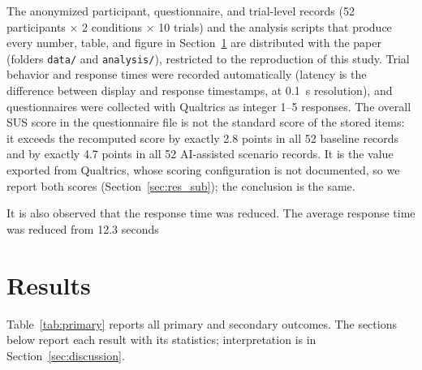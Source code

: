 \documentclass[journal]{IEEEtran}
\theoremstyle{plain}
\theoremstyle{definition}
\providecommand{\DIFaddtex}[1]{{\protect\color{blue} \sf #1}} %
\providecommand{\DIFdeltex}[1]{{\protect\color{red} \scriptsize #1}} %
\providecommand{\DIFaddbegin}{} %
\providecommand{\DIFaddend}{} %
\providecommand{\DIFdelbegin}{} %
\providecommand{\DIFdelend}{} %
\providecommand{\DIFadd}[1]{\texorpdfstring{\DIFaddtex{#1}}{#1}} %
\providecommand{\DIFdel}[1]{\texorpdfstring{\DIFdeltex{#1}}{}} %
\newcommand{\DIFscaledelfig}{0.5}
\newlength{\DIFdelgraphicswidth} %
\newlength{\DIFdelgraphicsheight} %
\newcommand{\DIFaddincludegraphics}[2][]{{\color{blue}\fbox{\DIFOincludegraphics[#1]{#2}}}} %
\newcommand{\DIFdelincludegraphics}[2][]{%
\sbox{\DIFdelgraphicsbox}{\DIFOincludegraphics[#1]{#2}}%
\settoboxwidth{\DIFdelgraphicswidth}{\DIFdelgraphicsbox} %
\settoboxtotalheight{\DIFdelgraphicsheight}{\DIFdelgraphicsbox} %
\scalebox{\DIFscaledelfig}{%
\parbox[b]{\DIFdelgraphicswidth}{\usebox{\DIFdelgraphicsbox}\\[-\baselineskip] \rule{\DIFdelgraphicswidth}{0em}}\llap{\resizebox{\DIFdelgraphicswidth}{\DIFdelgraphicsheight}{%
\setlength{\unitlength}{\DIFdelgraphicswidth}%
\begin{picture}(1,1)%
\thicklines\linethickness{2pt} %
{\color[rgb]{1,0,0}\put(0,0){\framebox(1,1){}}}%
{\color[rgb]{1,0,0}\put(0,0){\line( 1,1){1}}}%
{\color[rgb]{1,0,0}\put(0,1){\line(1,-1){1}}}%
\end{picture}%
}\hspace*{3pt}}} %
} %
\DeclareRobustCommand{\DIFaddbegin}{\DIFOaddbegin \let\includegraphics\DIFaddincludegraphics} %
\DeclareRobustCommand{\DIFaddend}{\DIFOaddend \let\includegraphics\DIFOincludegraphics} %
\DeclareRobustCommand{\DIFdelbegin}{\DIFOdelbegin \let\includegraphics\DIFdelincludegraphics} %
\DeclareRobustCommand{\DIFdelend}{\DIFOaddend \let\includegraphics\DIFOincludegraphics} %
\begin{document}
    \DIFadd{The anonymized participant, questionnaire, and trial-level records (52 participants $\times$ 2 conditions $\times$ 10 trials) and the analysis scripts that produce every number, table, and figure in Section~\ref{sec:results} are distributed with the paper (folders \texttt{data/} and \texttt{analysis/}), restricted to the reproduction of this study. Trial behavior and response times were recorded automatically (latency is the difference between display and response timestamps, at 0.1~s resolution), and questionnaires were collected with Qualtrics as integer 1--5 responses. The overall SUS score in the questionnaire file is not the standard score of the stored items: it exceeds the recomputed score by exactly 2.8 points in all 52 baseline records and by exactly 4.7 points in all 52 }\DIFaddend AI-assisted \DIFdelbegin \DIFdel{scenario}\DIFdelend \DIFaddbegin \DIFadd{records. It is the value exported from Qualtrics, whose scoring configuration is not documented, so we report both scores (Section~\ref{sec:res_sub}); the conclusion is the same}\DIFaddend .

    \DIFdelbegin \DIFdel{It is also observed that the response time was reduced.
The average response time was reduced from 12.3 seconds }\DIFdelend %
    \DIFaddbegin \section{\DIFadd{Results}}
    \label{sec:results}
    \DIFadd{Table~\ref{tab:primary} reports all primary and secondary outcomes. The sections below report each result with its statistics; interpretation is in Section~\ref{sec:discussion}.
}
\end{document}
